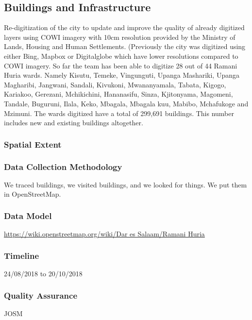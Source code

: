 \documentclass[a4paper,12pt,twoside]{article}
\begin{document}
\subsection{Buildings and Infrastructure}
\begin{multicols}{2}
Re-digitization of the city to update and improve the quality of already digitized layers using COWI imagery with 10cm resolution provided by the Ministry of Lands, Housing and Human Settlements. (Previously the city was digitized using either Bing, Mapbox or Digitalglobe which have lower resolutions compared to COWI imagery. So far the team has been able to digitize 28 out of 44 Ramani Huria wards. Namely Kisutu, Temeke, Vingunguti, Upanga Mashariki, Upanga Magharibi, Jangwani, Sandali, Kivukoni, Mwananyamala, Tabata, Kigogo, Kariakoo, Gerezani, Mchikichini, Hananasifu, Sinza, Kjitonyama, Magomeni, Tandale, Buguruni, Ilala, Keko, Mbagala, Mbagala kuu, Mabibo, Mchafukoge and Mzimuni. The wards digitized have a total of 299,691 buildings. This number includes new and existing buildings altogether.
\end{multicols}

\subsubsection{Spatial Extent}

\subsubsection{Data Collection Methodology}

We traced buildings, we visited buildings, and we looked for things. We put them in OpenStreetMap.

\subsubsection{Data Model}
\href{https://wiki.openstreetmap.org/wiki/Dar_es_Salaam/Ramani_Huria}{https://wiki.openstreetmap.org/wiki/Dar es Salaam/Ramani Huria}

\subsubsection{Timeline}
24/08/2018 to 20/10/2018

\subsubsection{Quality Assurance}
JOSM
\end{document}
